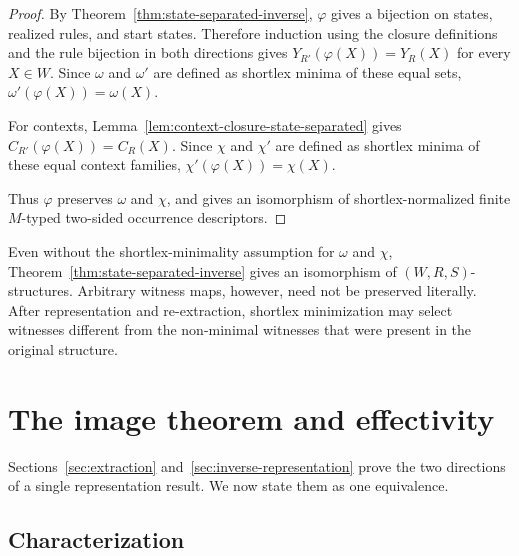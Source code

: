 \documentclass[sub]{jalc}
\begin{document}
\begin{proof}
By Theorem~\ref{thm:state-separated-inverse}, \(\varphi\) gives a bijection on states, realized rules, and start states. Therefore induction using the closure definitions and the rule bijection in both directions gives \(Y_{R'}(\varphi(X))=Y_R(X)\) for every \(X\in W\). Since \(\omega\) and \(\omega'\) are defined as shortlex minima of these equal sets, \(\omega'(\varphi(X))=\omega(X)\).

For contexts, Lemma~\ref{lem:context-closure-state-separated} gives \(C_{R'}(\varphi(X))=C_R(X)\). Since \(\chi\) and \(\chi'\) are defined as shortlex minima of these equal context families, \(\chi'(\varphi(X))=\chi(X)\).

Thus \(\varphi\) preserves \(\omega\) and \(\chi\), and gives an isomorphism of shortlex-normalized finite \(M\)-typed two-sided occurrence descriptors.
\end{proof}

\begin{remark}
Even without the shortlex-minimality assumption for \(\omega\) and \(\chi\), Theorem~\ref{thm:state-separated-inverse} gives an isomorphism of \((W,R,S)\)-structures. Arbitrary witness maps, however, need not be preserved literally. After representation and re-extraction, shortlex minimization may select witnesses different from the non-minimal witnesses that were present in the original structure.
\end{remark}

\section{The image theorem and effectivity}
\label{sec:characterization}

Sections~\ref{sec:extraction} and~\ref{sec:inverse-representation} prove the two directions of a single representation result. We now state them as one equivalence.

\subsection{Characterization}
\label{subsec:characterization}
\end{document}
